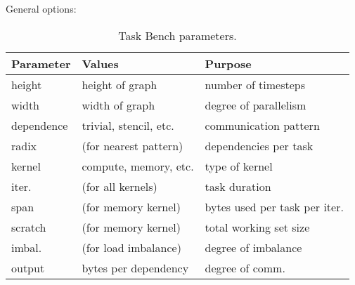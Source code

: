\begin{table}[t]
\small

General options:

\vspace{0.25em}

\begin{tabular}{l | l | l}
Parameter & Values & Purpose \\
\hline

height & height of graph & number of timesteps \\
width & width of graph & degree of parallelism \\
dependence & trivial, stencil, etc. & communication pattern \\
\quad \raisebox{0.35ex}{$\llcorner$} radix & \quad (for nearest pattern) & dependencies per task \\
kernel & compute, memory, etc. & type of kernel \\
\quad \raisebox{0.35ex}{$\llcorner$} iter. & \quad (for all kernels) & task duration \\
\quad \raisebox{0.35ex}{$\llcorner$} span & \quad (for memory kernel) & bytes used per task per iter. \\
\quad \raisebox{0.35ex}{$\llcorner$} scratch & \quad (for memory kernel) & total working set size \\
\quad \raisebox{0.35ex}{$\llcorner$} imbal. & \quad (for load imbalance) & degree of imbalance \\
output & bytes per dependency & degree of comm.
\end{tabular}

\caption{Task Bench parameters.\label{tab:parameters}}
\vspace{-0.75cm}
\end{table}
